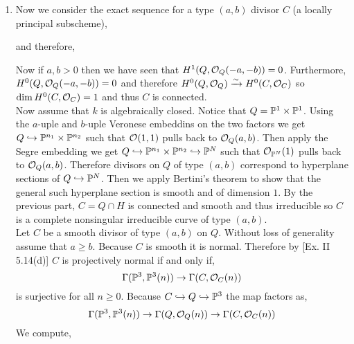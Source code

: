 \documentclass[12pt]{article}
\begin{document}
\begin{enumerate}
\item Now we consider the exact sequence for a type $(a,b)$ divisor $C$ (a locally principal subscheme),
\begin{center}
\end{center} 
and therefore,
\begin{center}
\end{center}
Now if $a, b > 0$ then we have seen that $H^1(Q, \struct{Q}(-a,-b)) = 0$. Furthermore, $H^0(Q, \struct{Q}(-a,-b)) = 0$ and therefore $H^0(Q, \struct{Q}) \iso H^0(C, \struct{C})$ so $\dim H^0(C, \struct{C}) = 1$ and thus $C$ is connected. 
\bigskip\\
Now assume that $k$ is algebraically closed. Notice that $Q = \P^1 \times \P^1$. Using the $a$-uple and $b$-uple Veronese embeddins on the two factors we get $Q \embed \P^{n_1} \times \P^{n_2}$ such that $\struct{}(1,1)$ pulls back to $\struct{Q}(a,b)$. Then apply the Segre embedding we get $Q \embed \P^{n_1} \times \P^{n_2} \embed \P^{N}$ such that $\struct{\P^N}(1)$ pulls back to $\struct{Q}(a,b)$. Therefore divisors on $Q$ of type $(a, b)$ correspond to hyperplane sections of $Q \embed \P^N$. Then we apply Bertini's theorem to show that the general such hyperplane section is smooth and of dimension $1$. By the previous part, $C = Q \cap H$ is connected and smooth and thus irreducible so $C$ is a complete nonsingular irreducible curve of type $(a,b)$.
\bigskip\\
Let $C$ be a smooth divisor of type $(a,b)$ on $Q$. Without loss of generality assume that $a \ge b$. Because $C$ is smooth it is normal. Therefore by [Ex. II 5.14(d)] $C$ is projectively normal if and only if,
\[ \Gamma(\P^3, \P^3(n)) \to \Gamma(C, \struct{C}(n)) \]
is surjective for all $n \ge 0$. Because $C \embed Q \embed \P^3$ the map factors as,
\[ \Gamma(\P^3, \P^3(n)) \to \Gamma(Q, \struct{Q}(n)) \to \Gamma(C, \struct{C}(n)) \]
We compute,
\begin{center}
\end{center}
\end{enumerate}
\end{document}
